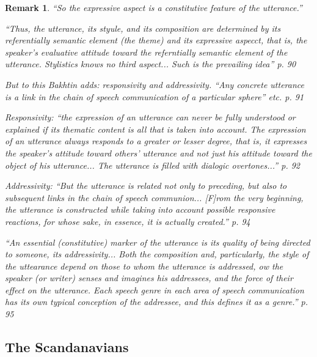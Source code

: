 \documentclass[11pt,twoside]{article}
\newtheorem{remark}{Remark}
\begin{document}
\begin{remark}
  ``So the expressive aspect is a constitutive feature of the utterance.''

``Thus, the utterance, its styule, and its composition are determined
  by its referentially semantic element (the theme) and its expressive
  aspecct, that is, the speaker's evaluative attitude toward the
  referntially semantic element of the utterance.  Stylistics knows no
  third aspect... Such is the prevailing idea'' p. 90

But to this Bakhtin adds: responsivity and addressivity.  ``Any
concrete utterance is a link in the chain of speech communication of a
particular sphere'' etc. p. 91

Responsivity: ``the expression of an utterance can never be fully
understood or explained if its thematic content is all that is taken
into account.  The expression of an utterance always \textit{responds}
to a greater or lesser degree, that is, it expresses the speaker's
attitude toward others' utterance and not just his attitude toward the
object of his utterance... The utterance is filled with
\textit{dialogic overtones}...'' p. 92

Addressivity: ``But the utterance is related not only to preceding,
but also to subsequent links in the chain of speech communion...
[F]rom the very beginning, the utterance is constructed while taking
into account possible responsive reactions, for whose sake, in
essence, it is actually created.'' p. 94

``An essential (constitutive) marker of the utterance is its quality
of being directed to someone, its \textit{addressivity}... Both the
composition and, particularly, the style of the uttearance depend on
those to whom the utterance is addressed, ow the speaker (or writer)
senses and imagines his addressees, and the force of their effect on
the utterance.  Each speech genre in each area of speech communication
has its own typical conception of the addressee, and this defines it
as a genre.''  p. 95
\end{remark}

\cite{bakhtin_problem_1986}

\cite{junefelt_proceedings_2009}

\subsection{The Scandanavians}
\end{document}
